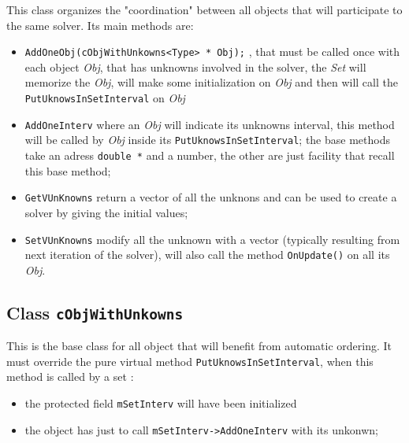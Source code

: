 This class organizes the "coordination" between all objects that will participate to the same solver.
Its main methods are:

\label{cSetIUK}

\begin{itemize}
    \item  {\tt  AddOneObj(cObjWithUnkowns<Type> * Obj);} , that must be called once with each object \emph{Obj},
           that has unknowns involved in the solver, the \emph{Set} will memorize the \emph{Obj},
           will make some initialization on  \emph{Obj} and then will call    the
           {\tt PutUknowsInSetInterval} on  \emph{Obj} 

    \item  {\tt  AddOneInterv} where an \emph{Obj}  will indicate its unknowns interval,
          this method will be  called by  \emph{Obj} inside its {\tt PutUknowsInSetInterval};
          the base methods take an adress {\tt double *} and a number, the other are
          just facility that recall this base method;
          
    \item  {\tt GetVUnKnowns}  return a vector of all the unknons and can be used to create a solver
           by giving the initial values;

    \item  {\tt SetVUnKnowns}  modify all the unknown with a vector (typically resulting from
           next iteration of the solver), will also call the method {\tt OnUpdate()} on all its \emph{Obj}.
\end{itemize}




\subsection{Class {\tt cObjWithUnkowns}}

\label{ClassOWU}

This is the base class for all object that will benefit from automatic ordering. It must override
the pure virtual method {\tt PutUknowsInSetInterval}, when this method is called by a set :

\begin{itemize}
   \item the protected field {\tt mSetInterv} will have been initialized 
   \item the object has just to call {\tt mSetInterv->AddOneInterv} with its unkonwn;
\end{itemize}

